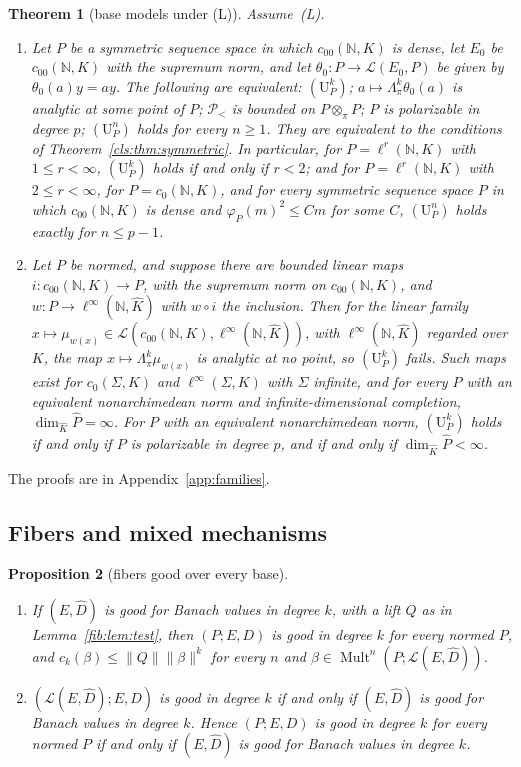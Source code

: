 \documentclass[11pt]{amsart}
\newtheorem{theorem}{Theorem}[section]
\newtheorem{proposition}[theorem]{Proposition}
\theoremstyle{definition}
\theoremstyle{remark}
\numberwithin{equation}{section}
\newcommand{\N}{\mathbb N}
\newcommand{\cL}{\mathcal L}
\newcommand{\Mult}{\operatorname{Mult}}
\newcommand{\linf}{\ell^\infty}
\newcommand{\norm}[1]{\lVert #1\rVert}
\newcommand{\Kh}{\widehat K}
\theoremstyle{plain}
\theoremstyle{definition}
\theoremstyle{plain}
\newcommand{\cP}{\mathcal P}
\begin{document}
\begin{theorem}[base models under (L)]\label{fam2:thm:bases}
Assume~\textup{(L)}.
\begin{enumerate}
\item Let $P$ be a symmetric sequence space in which $c_{00}(\N,K)$ is dense, let $E_0$ be $c_{00}(\N,K)$ with the supremum
norm, and let $\theta_0\colon P\to\cL(E_0,P)$ be given by $\theta_0(a)y=ay$. The following are equivalent:
$(\mathrm U^k_P)$; $a\mapsto\Lambda^k_\pi\theta_0(a)$ is analytic at some point of $P$; $\cP_<$ is bounded on $P\otimes_\pi P$;
$P$ is polarizable in degree $p$; $(\mathrm U^n_P)$ holds for every $n\ge1$. They are equivalent to the conditions of
Theorem~\ref{cls:thm:symmetric}. In particular, for $P=\ell^r(\N,K)$ with $1\le r<\infty$, $(\mathrm U^k_P)$ holds if and
only if $r<2$; and for $P=\ell^r(\N,K)$ with $2\le r<\infty$, for $P=c_0(\N,K)$, and for every symmetric sequence space $P$
in which $c_{00}(\N,K)$ is dense and $\varphi_P(m)^2\le Cm$ for some $C$, $(\mathrm U^n_P)$ holds exactly for $n\le p-1$.
\item Let $P$ be normed, and suppose there are bounded linear maps $i\colon c_{00}(\N,K)\to P$, with the supremum norm on
$c_{00}(\N,K)$, and $w\colon P\to\linf(\N,\Kh)$ with $w\circ i$ the inclusion. Then for the linear family
$x\mapsto\mu_{w(x)}\in\cL(c_{00}(\N,K),\linf(\N,\Kh))$, with $\linf(\N,\Kh)$ regarded over $K$, the map
$x\mapsto\Lambda^k_\pi\mu_{w(x)}$ is analytic at no point, so $(\mathrm U^k_P)$ fails. Such maps exist for $c_0(\Sigma,K)$ and
$\linf(\Sigma,K)$ with $\Sigma$ infinite, and for every $P$ with an equivalent nonarchimedean norm and infinite-dimensional
completion, $\dim_{\Kh}\widehat P=\infty$. For $P$ with an equivalent nonarchimedean norm, $(\mathrm U^k_P)$ holds if and
only if $P$ is polarizable in degree $p$, and if and only if $\dim_{\Kh}\widehat P<\infty$.
\end{enumerate}
\end{theorem}

The proofs are in Appendix~\ref{app:families}.

\subsection{Fibers and mixed mechanisms}\label{fam2:ssec:mixed}

\begin{proposition}[fibers good over every base]\label{fam2:prop:fibers}
\begin{enumerate}
\item If $(E,\widehat D)$ is good for Banach values in degree $k$, with a lift $Q$ as in Lemma~\ref{fib:lem:test}, then
$(P;E,D)$ is good in degree $k$ for every normed $P$, and $c_k(\beta)\le\norm Q\norm\beta^k$ for every $n$ and
$\beta\in\Mult^n(P;\cL(E,\widehat D))$.
\item $(\cL(E,\widehat D);E,D)$ is good in degree $k$ if and only if $(E,\widehat D)$ is good for Banach values in degree
$k$. Hence $(P;E,D)$ is good in degree $k$ for every normed $P$ if and only if $(E,\widehat D)$ is good for Banach values
in degree $k$.
\end{enumerate}
\end{proposition}
\end{document}
